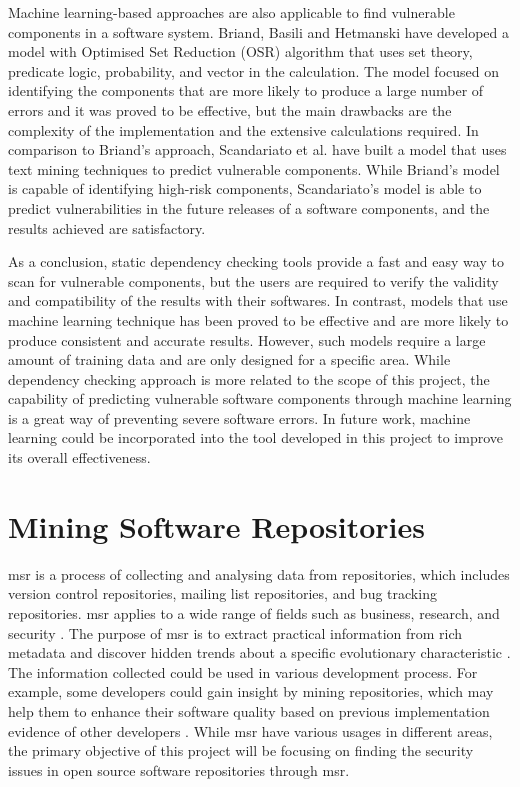 \documentclass[12pt, a4paper]{report}
\begin{document}
Machine learning-based approaches are also applicable to find vulnerable components in a software
system. Briand, Basili and Hetmanski \cite{briand_1993} have developed a model with Optimised Set
Reduction (OSR) algorithm that uses set theory, predicate logic, probability, and vector in the
calculation. The model focused on identifying the components that are more likely to produce a large
number of errors and it was proved to be effective, but the main drawbacks are the complexity of the
implementation and the extensive calculations required. In comparison to Briand's approach,
Scandariato et al. \cite{scandariato_2014} have built a model that uses text mining techniques to
predict vulnerable components. While Briand's model is capable of identifying high-risk components,
Scandariato's model is able to predict vulnerabilities in the future releases of a software
components, and the results achieved are satisfactory.

As a conclusion, static dependency checking tools provide a fast and easy way to scan for vulnerable
components, but the users are required to verify the validity and compatibility of the results with
their softwares. In contrast, models that use machine learning technique has been proved to be
effective and are more likely to produce consistent and accurate results. However, such models
require a large amount of training data and are only designed for a specific area. While dependency
checking approach is more related to the scope of this project, the capability of predicting
vulnerable software components through machine learning is a great way of preventing severe software
errors. In future work, machine learning could be incorporated into the tool developed in this
project to improve its overall effectiveness.

\section{Mining Software Repositories} \label{sec:msr}
\acrfull{msr} is a process of collecting and analysing data from repositories, which includes
version control repositories, mailing list repositories, and bug tracking repositories.
\acrshort{msr} applies to a wide range of fields such as business, research, and security
\cite{poncin_2011}. The purpose of \acrshort{msr} is to extract practical information from rich
metadata and discover hidden trends about a specific evolutionary characteristic \cite{kagdi_2007}.
The information collected could be used in various development process. For example, some developers
could gain insight by mining repositories, which may help them to enhance their software quality
based on previous implementation evidence of other developers \cite{hassan_2008}. While
\acrshort{msr} have various usages in different areas, the primary objective of this project will be
focusing on finding the security issues in open source software repositories through \acrshort{msr}.
\end{document}
